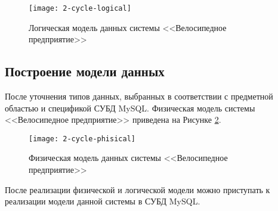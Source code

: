 \begin{figure}[h!]
	\centering
	\texttt{[image: 2-cycle-logical]}
	\caption{Логическая модель данных системы <<Велосипедное предприятие>>}
	\label{fig:2-cycle-logical}
\end{figure}
\newpage

\subsection{Построение модели данных}
После уточнения типов данных, выбранных в соответствии с предметной областью и спецификой СУБД MySQL.
Физическая модель системы <<Велосипедное предприятие>> приведена на Рисунке \ref{fig:2-cycle-phisical}.

\begin{figure}[h!]
	\centering
	\texttt{[image: 2-cycle-phisical]}
	\caption{Физическая модель данных системы <<Велосипедное предприятие>>}
	\label{fig:2-cycle-phisical}
\end{figure}

После реализации физической и логической модели можно приступать к реализации модели данной системы в СУБД MySQL.

\clearpage